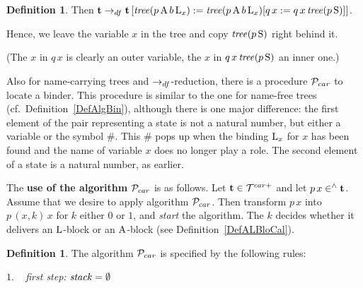 \documentclass{article}
\theoremstyle{plain}
\theoremstyle{definition}
\newtheorem{Def}[The]{Definition}
\begin{document}
{\begin{Def}
\smallskip

Then ${\bf t} \rightarrow_{df} {\bf t} \, [{\it tree}(p \, {\rm A} \, b \, {\rm L}_x) := {\it tree}(p \, {\rm A} \, b \, {\rm L}_x)[q \, x := q \, x \, {\it tree}(p \, {\rm S})]]$.
\end{Def}

Hence, we leave the variable $x$ in the tree and copy ${\it tree}(p \, {\rm S})$ right behind it.

(The $x$ in $q \, x$ is clearly an outer variable, the $x$ in $q \, x \, {\it tree}(p \, {\rm S})$ an inner one.)




Also for name-carrying trees and $\rightarrow_{df}$-reduction, there is a procedure ${\cal P}_{car}$ to locate a binder. This procedure is similar to the one for name-free trees (cf.\ Definition~\ref{DefAlgBin}), although there is one major difference: the first element of the pair representing a state is not a natural number, but either a variable or the symbol $\#$. This $\#$ pops up when the binding ${\rm L}_x$ for $x$ has been found and the name of variable $x$ does no longer play a role.  The second element of a state is a natural number, as earlier.

\smallskip

The {\bf use of the algorithm} ${\cal P}_{car}$ is as follows. Let ${\bf t} \in {\cal T}^{car+}$ and let $p \, x \in^\wedge {\bf t}$. Assume that we desire to apply algorithm ${\cal P}_{car}$. Then transform $p \, x$ into $p \, (x,k) \, x$ for $k$ either $0$ or $1$, and {\it start\/} the algorithm. The $k$ decides whether it delivers an ${\rm L}$-block or an ${\rm A}$-block (see Definition~\ref{DefALBloCal}).

\begin{Def}\label{DefAlgBinCar}
The algorithm ${\cal P}_{car}$ is specified by the following rules:

$1.$ ~ {\it first step:} ${\it stack} = \emptyset$



\end{Def}}
\end{document}
